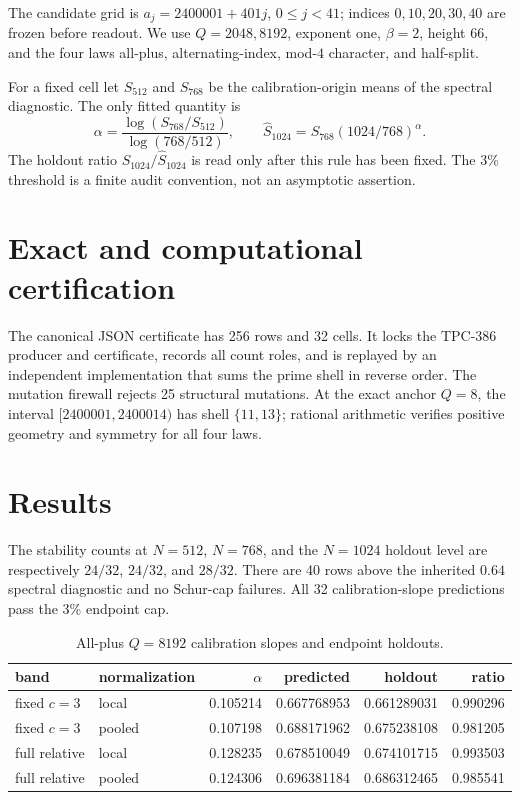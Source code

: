 \documentclass[10pt]{article}
\begin{document}
The candidate grid is $a_j=2400001+401j$, $0\leq j<41$; indices
$0,10,20,30,40$ are frozen before readout.  We use $Q=2048,8192$, exponent
one, $\beta=2$, height 66, and the four laws all-plus, alternating-index,
mod-$4$ character, and half-split.

For a fixed cell let $S_{512}$ and $S_{768}$ be the calibration-origin means
of the spectral diagnostic.  The only fitted quantity is
\[
 \alpha=\frac{\log(S_{768}/S_{512})}{\log(768/512)},
 \qquad \widehat S_{1024}=S_{768}(1024/768)^\alpha .
\]
The holdout ratio $S_{1024}/\widehat S_{1024}$ is read only after this rule
has been fixed.  The 3\% threshold is a finite audit convention, not an
asymptotic assertion.

\section{Exact and computational certification}

The canonical JSON certificate has 256 rows and 32 cells.  It locks the
TPC-386 producer and certificate, records all count roles, and is replayed by
an independent implementation that sums the prime shell in reverse order.
The mutation firewall rejects 25 structural mutations.  At the exact anchor
$Q=8$, the interval $[2400001,2400014)$ has shell $\{11,13\}$; rational
arithmetic verifies positive geometry and symmetry for all four laws.

\section{Results}

The stability counts at $N=512$, $N=768$, and the $N=1024$ holdout level are
respectively $24/32$, $24/32$, and $28/32$.  There are 40 rows above the
inherited $0.64$ spectral diagnostic and no Schur-cap failures.  All 32
calibration-slope predictions pass the 3\% endpoint cap.

\begin{table}[t]
\centering
\caption{All-plus $Q=8192$ calibration slopes and endpoint holdouts.}
\small
\begin{tabular}{@{}l l r r r r@{}}
\toprule
band & normalization & $\alpha$ & predicted & holdout & ratio\\
\midrule
fixed $c=3$ & local & 0.105214 & 0.667768953 & 0.661289031 & 0.990296\\
fixed $c=3$ & pooled & 0.107198 & 0.688171962 & 0.675238108 & 0.981205\\
full relative & local & 0.128235 & 0.678510049 & 0.674101715 & 0.993503\\
full relative & pooled & 0.124306 & 0.696381184 & 0.686312465 & 0.985541\\
\bottomrule
\end{tabular}
\end{table}
\end{document}
